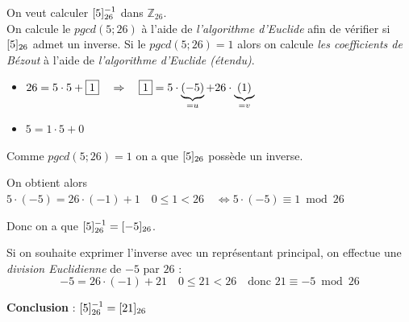 \begin{exemple}
	On veut calculer $\cl[26]{5} ^{-1}$ dans $\mathbb{Z}_{26}$.\\
	

		On calcule le $pgcd(5;26)$ à l'aide de \textit{l'algorithme d'Euclide} afin de vérifier si $\cl[26]{5}$ admet un inverse. Si le $pgcd(5;26) = 1$ alors on calcule \textit{les coefficients de Bézout} à l'aide de \textit{l'algorithme d'Euclide (étendu)}.
		
		\begin{itemize}[label=$\bullet$]
			\item $26 = 5 \cdot 5 + \fbox{1} \quad \Rightarrow \quad \fbox{1} = 5 \cdot \underbrace{(-5)}_{=u} + 26 \cdot \underbrace{(1)}_{=v}$
			\item $5 = 1 \cdot 5 + 0$
		\end{itemize}
		
		Comme $pgcd(5;26) = 1$ on a que $\cl[26]{5}$ possède un inverse.
		
		On obtient alors $5 \cdot (-5) = 26 \cdot (-1) + 1 \quad 0 \le 1 < 26 \quad \Leftrightarrow 5 \cdot (-5) \equiv 1 \bmod 26$
		
		Donc on a que $\cl[26]{5} ^{-1}= \cl[26]{-5}$.
		
		Si on souhaite exprimer l’inverse avec un représentant principal, on effectue une \textit{division Euclidienne} de $-5$ par $26$ :
		\[
		-5 = 26 \cdot (-1) + 21 \quad 0 \le 21 < 26 \quad \text{donc } 21 \equiv -5 \bmod 26
		\]
		
		\textbf{Conclusion} : $\cl[26]{5} ^{-1}= \cl[26]{21}$

\end{exemple}


